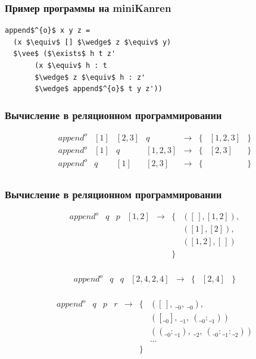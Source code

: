 \documentclass{beamer}
\begin{document}
\begin{frame}[fragile]
  \transwipe[direction=90]
  \frametitle{Пример программы на miniKanren}
\begin{center}
\begin{minipage}{4.5cm}
\begin{lstlisting}[frame=single]  
append$^{o}$ x y z = 
  (x $\equiv$ [] $\wedge$ z $\equiv$ y)
  $\vee$ ($\exists$ h t z'
       (x $\equiv$ h : t 
       $\wedge$ z $\equiv$ h : z' 
       $\wedge$ append$^{o}$ t y z'))
\end{lstlisting}
\end{minipage}
\end{center}
\end{frame}


\begin{frame}[fragile]
  \transwipe[direction=90]
  \frametitle{Вычисление в реляционном программировании}
  
$$ 
\begin{array}{lccccccl}
append^o & [1] & [2, 3] & q         &\rightarrow& \{ &  [1, 2, 3] & \} \\
append^o & [1] & q      & [1, 2, 3] &\rightarrow& \{ & [2, 3] & \} \\
append^o & q   & [1]    & [2, 3]    &\rightarrow& \{ & & \}  \\
\end{array}
$$

\end{frame}

\begin{frame}[fragile]
  \transwipe[direction=90]
  \frametitle{Вычисление в реляционном программировании}

$$ 
\begin{array}{lcccccl}
append^o & q & p & [1, 2] &\rightarrow& \{ & ([\,], [1,2]), \\
         &   &   &        &           &    & ([1], [2]), \\
         &   &   &        &           &    & ([1,2], [\,]) \\
         &   &   &        &           & \} \\
\end{array}
$$ 

$$
\begin{array}{lccccclc}
append^o & q & q & [2, 4, 2, 4] &\rightarrow& \{ &  [2, 4]  &    \} \\
\end{array}
$$ 

$$
\begin{array}{lcccccl}
append^o & q & p & r    &\rightarrow& \{ &([\,], \ \__0, \ \__0), \\
         &   &   &        &           &    & ([\__0], \  \__1, \ (\__0:\__1)) \\
         &   &   &        &           &    & ((\__0 : \__1),\  \__2, \ (\__0:\__1:\__2)) \\
         &   &   &        &           &    & \dots \\
         &   &   &        &           &    \}  \\
\end{array}
$$

\end{frame}
\end{document}
